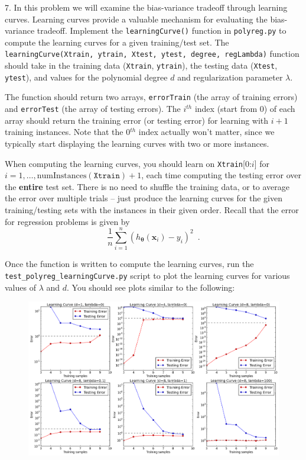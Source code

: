 7.  In this problem we will examine the bias-variance tradeoff through learning curves. Learning curves provide a valuable mechanism for evaluating the bias-variance tradeoff. Implement the \texttt{learningCurve()} function in \texttt{polyreg.py} to compute the learning curves for a given training/test set.  The \texttt{learningCurve(Xtrain, ytrain, Xtest, ytest, degree, regLambda)} function should take in the training data (\texttt{Xtrain}, \texttt{ytrain}), the testing data (\texttt{Xtest}, \texttt{ytest}), and values for the polynomial degree $d$ and regularization parameter $\lambda$. 

The function should return two arrays, \texttt{errorTrain} (the array of training errors) and \texttt{errorTest} (the array of testing errors).  The $i^{th}$ index (start from 0) of each array should return the training error (or testing error) for learning with $i +1$ training instances.  Note that the 0$^{th}$ index actually won't matter, since we typically start displaying the learning curves with two or more instances.


\vspace{.1in}
When computing the learning curves, you should learn on \texttt{Xtrain}[0:$i$] for $i = 1, \ldots, \text{numInstances}(\texttt{Xtrain})+1$, each time computing the testing error over the {\bf entire} test set.  There is no need to shuffle the training data, or to average the error over multiple trials -- just produce the learning curves for the given training/testing sets with the instances in their given order.  Recall that the error for regression problems is given by
\begin{equation}
\frac{1}{n} \sum_{i=1}^n (h_{\bm{\theta}}(\mathbf{x}_i) - y_i)^2 \enspace .
\end{equation}

Once the function is written to compute the learning curves, run the \texttt{test\_polyreg\_learningCurve.py} script to plot the learning curves for various values of $\lambda$ and $d$.  You should see plots similar to the following:
\begin{figure}[ht!]
      \centering
      \vspace{-1em}
      \includegraphics[width=\textwidth]{images/polyregLearningCurves.png}
      \vspace{-1em}
    \end{figure}

